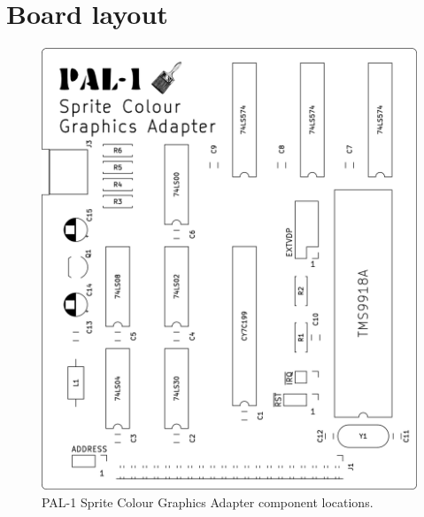 \documentclass[a4paper,11pt,twoside,openright]{report}
\begin{document}
%

\chapter{Board layout}
\begin{figure}[h!]
\centering
\includegraphics[scale=.25]{images/scga-brd-1.0a.png}
\caption[Sprite Colour Graphics Adapter component locations]{PAL-1 Sprite Colour Graphics Adapter component locations.}
\label{fig:layout}
\end{figure}

%



\end{document}
